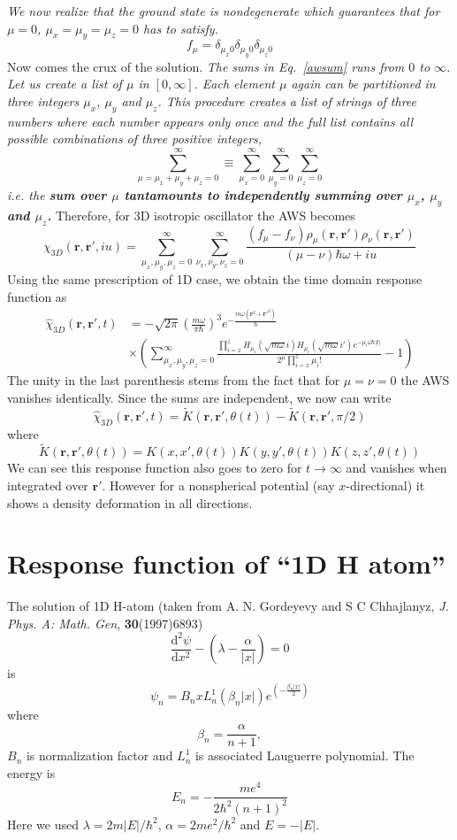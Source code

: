 \documentclass[jcp,groupaddress]{revtex4-1}
\newcommand{\eq}{\begin{equation}}
\newcommand{\qe}{\end{equation}}
\newcommand{\lp}{\left(}
\newcommand{\rp}{\right)}
\newcommand{\diff}{\mathrm{d}}
\newcommand{\rr}{\mathbf{r}}
\newcommand{\abs}[1]{\vert #1\vert}
\newcommand{\ie}{\emph{i.e. }}
\begin{document}
\emph{We now realize that the ground state is nondegenerate which guarantees that for $\mu = 0$, $\mu_{x} = \mu_{y} = \mu_{z} = 0$ has to satisfy.} 
\eq
f_{\mu} = \delta_{\mu_{x}0}\delta_{\mu_{y}0}\delta_{\mu_{z}0}
\qe
  Now comes the crux of the solution. \emph{The sums in Eq.~\eqref{awsum} runs from $0$ to $\infty$. Let us create a list of $\mu$ in $[0,\infty]$. Each element $\mu$ again can be partitioned in three integers $\mu_{x}$, $\mu_{y}$ and $\mu_{z}$. This procedure creates a list of strings of three numbers where each number appears only once and the full list contains all possible combinations of three positive integers, }
\eq
\sum_{\mu= \mu_{x}+\mu_{y}+\mu_{z}= 0}^{\infty} \equiv \sum_{\mu_{x}=0}^{\infty}\sum_{\mu_{y}=0}^{\infty}\sum_{\mu_{z}= 0}^{\infty} 
\qe
 \emph{ \ie the \textbf{sum over $\mu $ tantamounts to independently summing over $\mu_{x}$, $\mu_{y}$ and $\mu_{z}$.}} Therefore, for 3D isotropic oscillator the AWS becomes
\eq
\chi_{3D}(\rr, \rr',i u) = \sum_{\mu_{x},\mu_{y},\mu_{z} = 0}^{\infty}  \sum_{\nu_{x},\nu_{y},\nu_{z} = 0}^{\infty} \frac{(f_{\mu}-f_{\nu})\rho_{\mu}(\rr, \rr')\rho_{\nu}(\rr, \rr')}{(\mu-\nu)\hbar\omega + i u}
\qe 
Using the same prescription of 1D case, we obtain the time domain response function as 
\eq
\begin{split}
\hat{\chi}_{3D}(\rr, \rr', t)& =-\sqrt{2\pi} \lp\frac{m \omega}{ \pi\hbar}\rp^{3} e^{-\frac{m\omega(\rr^2+\rr'^2)}{\hbar}} \\
&\times \left( \sum_{\mu_{x},\mu_{y},\mu_{z} = 0}^{\infty} \frac{\prod_{i = x}^{z}H_{\mu_{i}}(\sqrt{m \omega} i)H_{\mu_{i}}(\sqrt{m \omega} i')e^{-\mu_{i}\omega\hbar\abs{t}}}{2^{\mu}\prod_{i = x}^{z}\mu_{i}!} - 1\right)
\end{split}
\qe
The unity in the last parenthesis stems from the fact that for $\mu=\nu=0$ the AWS vanishes identically. Since the sums are independent, we now can write
\eq
\hat{\chi}_{3D}(\rr, \rr', t) = \tilde K(\rr, \rr', \theta(t))- \tilde K(\rr, \rr', \pi/2)
\qe
where 
\eq
  \tilde K(\rr, \rr', \theta(t))= K(x, x', \theta(t)) K(y, y', \theta(t)) K(z, z', \theta(t))
\qe
We can see this response function also goes to zero for $t \rightarrow \infty$ and vanishes when integrated over $\rr'$. However for a nonspherical potential (say $x$-directional) it shows a density deformation in all directions.  
\section{Response function of ``1D H atom''}
The solution of 1D H-atom (taken from A. N. Gordeyevy and S C Chhajlanyz, \emph{J. Phys. A: Math. Gen}, \textbf{30}(1997)6893)
\eq
\frac{\diff^2 \psi}{\diff x^2} -\left( \lambda - \frac{\alpha}{\abs{x}}\right) = 0
\qe 
is 
\eq
\psi_{n} = B_{n} x L_{n}^{1}(\beta_{n}\abs{x})e^{\left(-\frac{\beta_{n}\abs{x}}{2}\right)}
\qe
where 
\eq
\beta_n = \frac{\alpha}{n+1},
\qe
$B_n$ is normalization factor and $L_{n}^{1}$ is associated Lauguerre polynomial. 
The energy is
\eq
E_n= -\frac{m e^4}{2 \hbar^2(n+1)^2}
\qe
Here we used $\lambda = 2m\abs{E}/\hbar^2$, $\alpha = 2m e^2/\hbar^2$ and $E = -\abs{E}$. 
\end{document}
